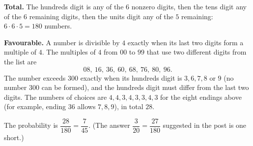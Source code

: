 \textbf{Total.} The hundreds digit is any of the $6$ nonzero digits, then the tens digit any of the $6$ remaining digits, then the units digit any of the $5$ remaining: $6\cdot6\cdot5=180$ numbers.

\textbf{Favourable.} A number is divisible by $4$ exactly when its last two digits form a multiple of $4$. The multiples of $4$ from $00$ to $99$ that use two different digits from the list are
\[
08,\ 16,\ 36,\ 60,\ 68,\ 76,\ 80,\ 96 .
\]
The number exceeds $300$ exactly when its hundreds digit is $3,6,7,8$ or $9$ (no number $300$ can be formed), and the hundreds digit must differ from the last two digits. The numbers of choices are $4,4,3,4,3,3,4,3$ for the eight endings above (for example, ending $36$ allows $7,8,9$), in total $28$.

The probability is $\dfrac{28}{180}=\boxed{\dfrac{7}{45}}$. (The answer $\dfrac{3}{20}=\dfrac{27}{180}$ suggested in the post is one short.)
